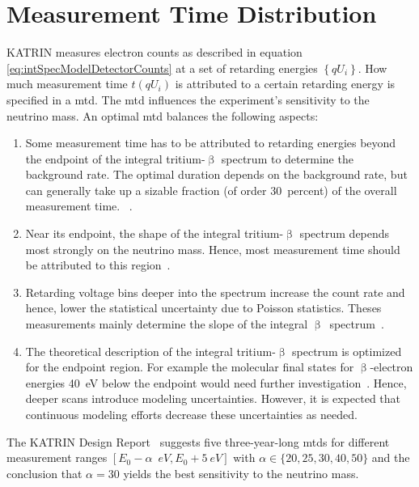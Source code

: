 \section{Measurement Time Distribution}
\label{sec:intSpecModelMTD}
KATRIN measures electron counts as described in equation \eqref{eq:intSpecModelDetectorCounts} at a set of retarding energies $\left\{qU_i\right\}$. How much measurement time $t(qU_i)$ is attributed to a certain retarding energy is specified in a \gls{mtd}. The \gls{mtd} influences the experiment's sensitivity to the neutrino mass. An optimal \gls{mtd} balances the following aspects:
\begin{enumerate}
	\item Some measurement time has to be attributed to retarding energies beyond the endpoint of the integral tritium-$\upbeta$ spectrum to determine the background rate. The optimal duration depends on the background rate, but can generally take up a sizable fraction (of order \SI{30}{percent}) of the overall measurement time. ~\cite{Angrik:2005ep, Kleesiek2014}.
	\item Near its endpoint, the shape of the integral tritium-$\upbeta$ spectrum depends most strongly on the neutrino mass. Hence, most measurement time should be attributed to this region~\cite{Angrik:2005ep, Kleesiek2014}.
	\item Retarding voltage bins deeper into the spectrum increase the count rate and hence, lower the statistical uncertainty due to Poisson statistics. Theses measurements mainly determine the slope of the integral $\upbeta$~spectrum~\cite{Angrik:2005ep, Kleesiek2014}.
	\item The theoretical description of the integral tritium-$\upbeta$ spectrum is optimized for the endpoint region. For example the molecular final states for $\upbeta$-electron energies \SI{40}{eV} below the endpoint would need further investigation~\cite{Doss:2006}. Hence, deeper scans introduce modeling uncertainties. However, it is expected that continuous modeling efforts decrease these uncertainties as needed.
\end{enumerate}
The KATRIN Design Report~\cite{Angrik:2005ep} suggests five \mbox{three-year-long} \gls{mtd}s for different measurement ranges $[E_0-\alpha\;\SI{}{eV}, E_0 + \SI{5}{eV}]$ with $\alpha \in \{20, 25, 30, 40, 50\}$ and the conclusion that $\alpha=30$ yields the best sensitivity to the neutrino mass.

